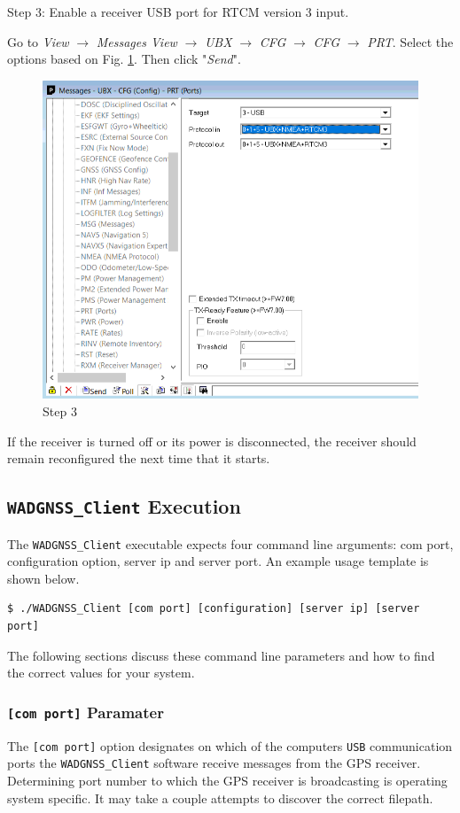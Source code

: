 Step 3: Enable a receiver USB port for RTCM version 3 input. 


Go to \emph{View} $\rightarrow$ \emph{Messages View} $\rightarrow$ \emph{UBX} $\rightarrow$ \emph{CFG} $\rightarrow$ \emph{CFG} $\rightarrow$ \emph{PRT}. Select the options based on Fig. \ref{fig:usb}. Then click "\emph{Send}". 
\begin{figure}[H]
	\centering
	\includegraphics[scale=0.4]{./graphics/usb}
	\caption{Step 3 \label{fig:usb}}
\end{figure}

\green 
If the receiver is turned off or its power is disconnected, the receiver should remain reconfigured the next time that  it starts.
\black

\subsection{\texttt{WADGNSS\_Client} Execution}
The \texttt{WADGNSS\_Client} executable expects four command line arguments: com port, configuration option, server ip and server port. An example usage template is shown below. 
\begin{verbatim}
$ ./WADGNSS_Client [com port] [configuration] [server ip] [server port]
\end{verbatim}
The following sections discuss these command line parameters and how to find the correct values for your system. 

\subsubsection{\texttt{[com port]} Paramater}
The \texttt{[com port]} option designates on which of the computers \texttt{USB} communication ports the \texttt{WADGNSS\_Client} software receive messages from the GPS receiver. 
Determining port number to which the GPS receiver is broadcasting is operating system specific.
It may take a couple attempts to discover the correct filepath. 

